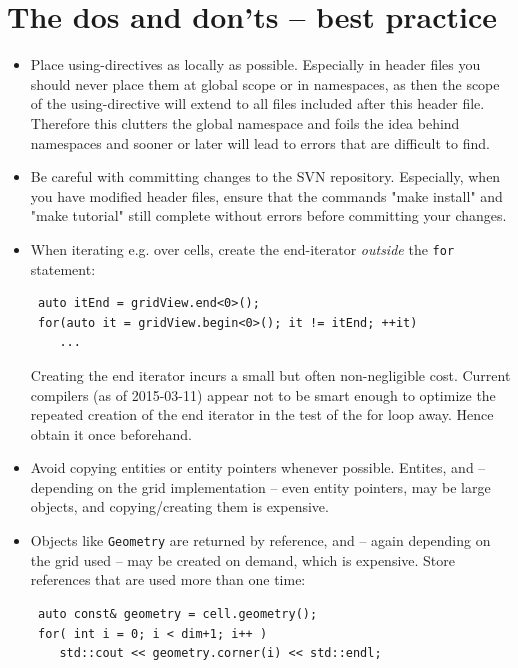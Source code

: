 \documentclass[11pt]{article}
\begin{document}
\section{The dos and don'ts -- best practice} \label{theDos}
\begin{itemize}
\item Place using-directives as locally as possible. Especially in header files you should never place them at global scope or in namespaces, as then the scope of the using-directive will extend to all files included after this header file. Therefore this clutters the global namespace and foils the idea behind namespaces and sooner or later will lead to errors that are difficult to find. 

\item Be careful with committing changes to the SVN repository. Especially, when you have modified header files, ensure that the commands "make install" and "make tutorial" still complete without errors before committing your changes. 

\item When iterating e.g. over cells, create the end-iterator \emph{outside} the \verb+for+ statement:
\begin{lstlisting}
 auto itEnd = gridView.end<0>();
 for(auto it = gridView.begin<0>(); it != itEnd; ++it)
    ...
\end{lstlisting}
Creating the end iterator incurs a small but often non-negligible cost. Current compilers (as of 2015-03-11) appear not to be smart enough to optimize the repeated creation of the end iterator in the test of the for loop away. Hence obtain it once beforehand.

\item Avoid copying entities or entity pointers whenever possible. Entites, and -- depending on the grid implementation -- even entity pointers, 
may be large objects, and copying/creating them is expensive.

\item Objects like \verb+Geometry+ are returned by reference, and -- again depending on the grid used -- may be created on demand, which is expensive. 
Store references that are used more than one time:
\begin{lstlisting}
 auto const& geometry = cell.geometry();
 for( int i = 0; i < dim+1; i++ ) 
    std::cout << geometry.corner(i) << std::endl;
\end{lstlisting}
\end{itemize}
\end{document}
